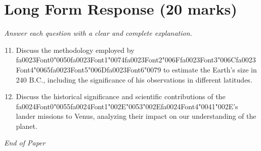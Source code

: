 \documentclass[12pt]{article}
\begin{document}
\section*{Long Form Response (20 marks)}
\textit{Answer each question with a clear and complete explanation.}
\begin{enumerate}[label=\arabic*.]
\setcounter{enumi}{10}
\item Discuss the methodology employed by {\csname fa0023Font0\endcsname\char"0050}{\csname fa0023Font1\endcsname\char"0074}{\csname fa0023Font2\endcsname\char"006F}{\csname fa0023Font3\endcsname\char"006C}{\csname fa0023Font4\endcsname\char"0065}{\csname fa0023Font5\endcsname\char"006D}{\csname fa0023Font6\endcsname\char"0079} to estimate the Earth's size in 240 B.C.,
including the significance of his observations in different latitudes.
\item Discuss the historical significance and scientific contributions of the {\csname fa0024Font0\endcsname\char"0055}{\csname fa0024Font1\endcsname\char"002E}{\char"0053}{\char"002E}{\csname fa0024Font4\endcsname\char"0041}{\char"002E}'s lander
missions to Venus, analyzing their impact on our understanding of the planet.
\end{enumerate}

\vfill
\noindent\textit{End of Paper}
\end{document}
